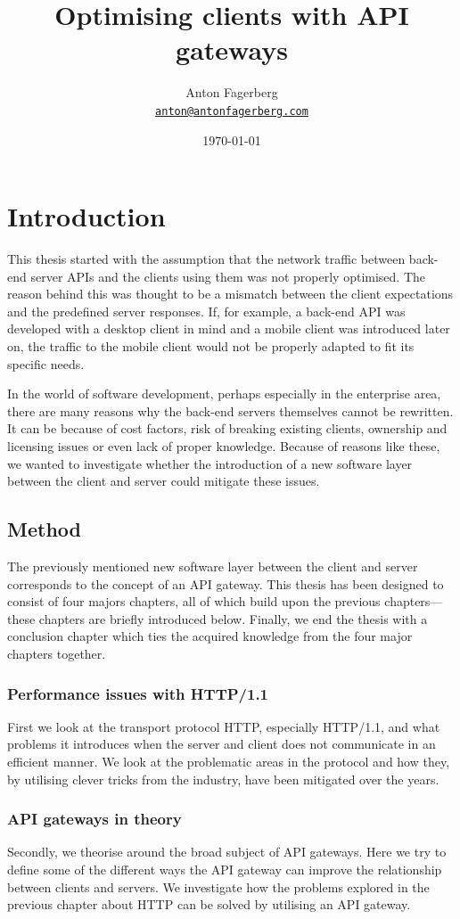 \documentclass{cslthse-msc}
\author{
	Anton Fagerberg \\
	{\normalsize \href{mailto:anton@antonfagerberg.com}{\texttt{anton@antonfagerberg.com}}}
}
\title{Optimising clients with API gateways}
\subtitle{}
\date{\today}
\begin{document}
\makefrontmatter

\chapter{Introduction}
This thesis started with the assumption that the network traffic between back-end server APIs and the clients using them was not properly optimised. The reason behind this was thought to be a mismatch between the client expectations and the predefined server responses. If, for example, a back-end API was developed with a desktop client in mind and a mobile client was introduced later on, the traffic to the mobile client would not be properly adapted to fit its specific needs.

In the world of software development, perhaps especially in the enterprise area, there are many reasons why the back-end servers themselves cannot be rewritten. It can be because of cost factors, risk of breaking existing clients, ownership and licensing issues or even lack of proper knowledge. Because of reasons like these, we wanted to investigate whether the introduction of a new software layer between the client and server could mitigate these issues.

\section{Method}

The previously mentioned new software layer between the client and server corresponds to the concept of an API gateway. This thesis has been designed to consist of four majors chapters, all of which build upon the previous chapters---these chapters are briefly introduced below. Finally, we end the thesis with a conclusion chapter which ties the acquired knowledge from the four major chapters together.

\subsection{Performance issues with HTTP/1.1}
First we look at the transport protocol HTTP, especially HTTP/1.1, and what problems it introduces when the server and client does not communicate in an efficient manner. We look at the problematic areas in the protocol and how they, by utilising clever tricks from the industry, have been mitigated over the years.

\subsection{API gateways in theory}
Secondly, we theorise around the broad subject of API gateways. Here we try to define some of the different ways the API gateway can improve the relationship between clients and servers. We investigate how the problems explored in the previous chapter about HTTP can be solved by utilising an API gateway.
\end{document}
